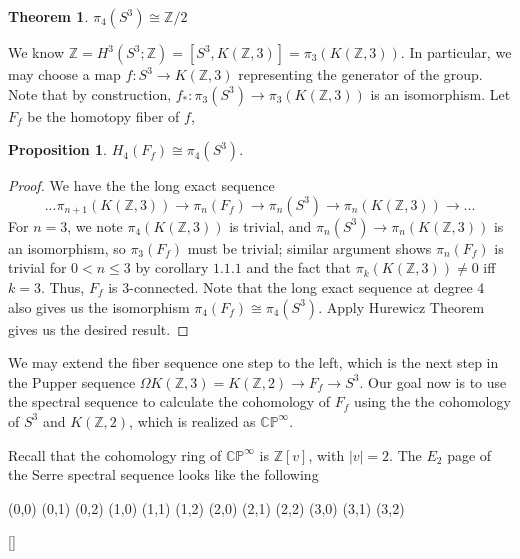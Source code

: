 \documentclass{article}
\theoremstyle{definition}
\newtheorem{theorem}{Theorem}[section]
\theoremstyle{definition}
\theoremstyle{definition}
\newtheorem{proposition}{Proposition}[section]
\theoremstyle{definition}
\theoremstyle{definition}
\theoremstyle{definition}
\theoremstyle{definition}
\begin{document}
\begin{tcolorbox}[colback=red!5!white,colframe=red!30!white]
\begin{theorem}
    $\pi_4(S^3)\cong \mathbb{Z}/2$
\end{theorem}
\end{tcolorbox}
We know $\mathbb{Z}=H^3(S^3;\mathbb{Z})=[S^3,K(\mathbb{Z},3)]=\pi_3(K(\mathbb{Z},3))$. In particular, we may choose a map $f: S^3\to K(\mathbb{Z},3)$ representing the generator of the group. Note that by construction, $f_*: \pi_3(S^3)\to \pi_3(K(\mathbb{Z},3))$ is an isomorphism. Let $F_f$ be the homotopy fiber of $f$,

\begin{tcolorbox}[colback=blue!5!white,colframe=blue!30!white]
\begin{proposition}
$H_4(F_f)\cong \pi_4(S^3)$.
\end{proposition}
\end{tcolorbox}

\begin{proof}
We have the the long exact sequence 
\[ ...\pi_{n+1}(K(\mathbb{Z},3))\to\pi_n(F_f)\to \pi_n(S^3)\to \pi_n(K(\mathbb{Z},3))\to...\]
For $n=3$, we note $\pi_{4}(K(\mathbb{Z},3))$ is trivial, and $\pi_n(S^3)\to \pi_n(K(\mathbb{Z},3))$ is an isomorphism, so $\pi_3(F_f)$ must be trivial; similar argument shows $\pi_n(F_f)$ is trivial for $0<n\leq 3$ by corollary $1.1.1$ and the fact that $\pi_k(K(\mathbb{Z},3))\neq 0$ iff $k=3$. Thus, $F_f$ is $3$-connected. Note that the long exact sequence at degree $4$ also gives us the isomorphism $\pi_4(F_f)\cong \pi_4(S^3)$. Apply Hurewicz Theorem gives us the desired result.
\end{proof}

We may extend the fiber sequence one step to the left, which is the next step in the Pupper sequence $\Omega K(\mathbb{Z},3)=K(\mathbb{Z},2)\to F_f\to S^3$. Our goal now is to use the spectral sequence to calculate the cohomology of $F_f$ using the the cohomology of $S^3$ and $K(\mathbb{Z},2)$, which is realized as $\mathbb{CP}^{\infty}$. 

Recall that the cohomology ring of $\mathbb{CP}^{\infty}$ is $\mathbb{Z}[v]$, with $|v|=2$. The $E_2$ page of the Serre spectral sequence looks like the following 


\begin{center}
    \begin{sseqdata}[ name= 4, xscale = 0.6,  classes = {draw = none } ]
    \class["\mathbb{Z}1"](0,0)
    \class["0"](0,1)
    \class["\mathbb{Z}v_1"](0,2)
    \class["0"](1,0)
    \class["0"](1,1)
    \class["0"](1,2)
    \class["0"](2,0)
    \class["0"](2,1)
    \class["0"](2,2)
    \class["\mathbb{Z}k"](3,0)
    \class["0"](3,1)
    \class["\mathbb{Z}v_1k"](3,2)
    \end{sseqdata}[]
    \end{center}
\end{document}
